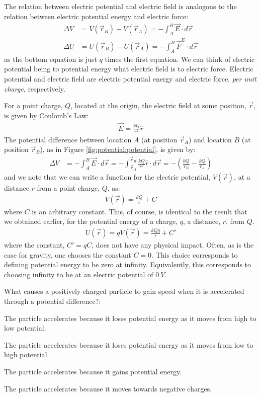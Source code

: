 The relation between electric potential and electric field is analogous to the relation between electric potential energy and electric force:
\begin{align*}
\Delta V &=V(\vec r_B)-V(\vec r_A)=-\int_A^B  \vec E\cdot d\vec r\\
\Delta U &=U(\vec r_B)-U(\vec r_A)=-\int_A^B  \vec F^E\cdot d\vec r
\end{align*}
as the bottom equation is just $q$ times the first equation. We can think of electric potential being to potential energy what electric field is to electric force. Electric potential and electric field are electric potential energy and electric force, \textit{per unit charge}, respectively.

For a point charge, $Q$, located at the origin, the electric field at some position, $\vec r$, is given by Coulomb's Law:
\begin{align*}
\vec E=\frac{kQ}{r^2}\hat r
\end{align*}
The potential difference between location $A$ (at position $\vec r_A$) and location $B$ (at position $\vec r_B$), as in Figure \ref{fig:potential:potential}, is given by:
\begin{align*}
\Delta V &=- \int_A^B  \vec E\cdot d\vec r= -\int_{\vec r_A}^{\vec r_B}  \frac{kQ}{r^2}\hat r\cdot d\vec r=-\left(\frac{kQ}{r_B}-\frac{kQ}{r_A}\right)
\end{align*}
and we note that we can write a function for the electric potential, $V(\vec r)$, at a distance $r$ from a point charge, $Q$, as:
\begin{align*}
V(\vec r)=\frac{kQ}{r}+C
\end{align*}
where $C$ is an arbitrary constant. This, of course, is identical to the result that we obtained earlier, for the potential energy of a charge, $q$, a distance, $r$, from $Q$. 
\begin{align*}
U(\vec r)=qV(\vec r)=\frac{kQq}{r}+C'
\end{align*}
where the constant, $C'=qC$, does not have any physical impact. Often, as is the case for gravity, one chooses the constant $C=0$. This choice corresponds to defining potential energy to be zero at infinity. Equivalently, this corresponds to choosing infinity to be at an electric potential of $\SI{0}{V}$.


\begin{checkpoint}
	\begin{MCquestion}{What causes a positively charged particle to gain speed when it is accelerated through a potential difference?:}
		\item The particle accelerates because it loses potential energy as it moves from high to low potential. \correct
		\item The particle accelerates because it loses potential energy as it moves from low to high potential
		\item The particle accelerates because it gains potential energy.
		\item The particle accelerates because it moves towards negative charges.
	\end{MCquestion}
\end{checkpoint}

